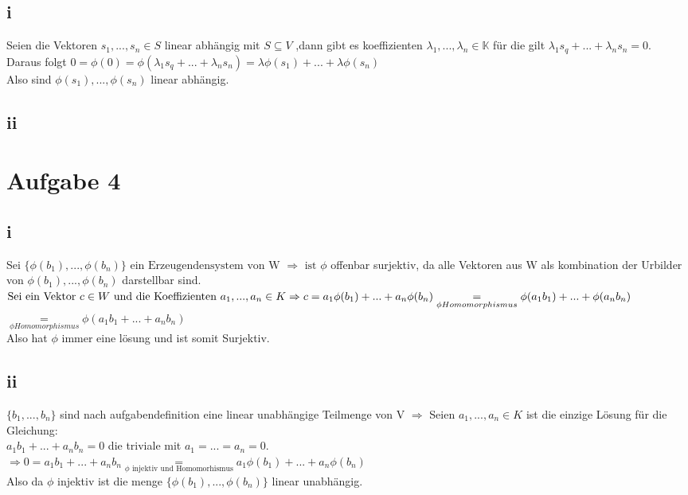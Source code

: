 \documentclass[10pt,a4paper]{article}
\begin{document}
 \subsection{i}
 Seien die Vektoren $s_1, ... , s_n \in S$ linear abhängig mit $S \subseteq V$ ,dann gibt es koeffizienten $\lambda_1 , ... , \lambda_n \in \mathbb{K}$ für die gilt $\lambda_1 s_q + ... + \lambda_n s_n = 0$.\\
 Daraus folgt $0 = \phi(0) = \phi(\lambda_1 s_q + ... + \lambda_n s_n) = \lambda \phi(s_1)+...+\lambda \phi(s_n)$\\
 Also sind $ \phi(s_1),...,\phi(s_n)$ linear abhängig.
 \subsection{ii}
 \section{Aufgabe 4}
 \subsection{i}
 Sei $\{\phi(b_1),...,\phi(b_n)\} \text{ ein Erzeugendensystem von W } \Rightarrow \text{ ist } \phi $ offenbar surjektiv, da alle Vektoren aus W als kombination der Urbilder von $\phi(b_1),...,\phi(b_n)$ darstellbar sind.\\
 $\text{Sei ein Vektor } c \in W \text{ und die Koeffizienten } a_1,...,a_n \in K \Rightarrow \\ c = a_1\phi(b_1)+...+a_n\phi(b_n) \underset{\phi Homomorphismus}{=} \phi(a_1 b_1)+...+\phi(a_n b_n)\\ $\\
 $ \underset{\phi Homomorphismus}{=} \phi(a_1 b_1+...+a_n b_n) $ \\
 Also hat $\phi$ immer eine lösung und ist somit Surjektiv.
 \subsection{ii}
 $\{b_1,...,b_n \}$ sind nach aufgabendefinition eine linear unabhängige Teilmenge von V $\Rightarrow$  Seien $a_1,...,a_n \in K$ ist die einzige Lösung für die Gleichung:\\ $a_1b_1+...+a_nb_n=0$ die triviale mit $a_1=...=a_n = 0$.\\
 $\Rightarrow 0=a_1b_1+...+a_nb_n \underset{\phi \text{ injektiv und Homomorhismus}}{=} a_1\phi(b_1)+...+a_n\phi(b_n)$\\
 Also da $\phi$ injektiv ist die menge $\{\phi(b_1),...,\phi(b_n)\}$ linear unabhängig.
\end{document}
